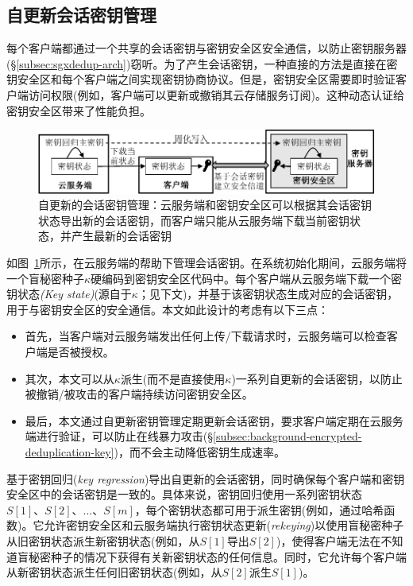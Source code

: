 \subsection{自更新会话密钥管理}
\label{subsec:sgxdedup-key-management}

每个客户端都通过一个共享的会话密钥与密钥安全区安全通信，以防止密钥服务器 (\S\ref{subsec:sgxdedup-arch})窃听。为了产生会话密钥，一种直接的方法是直接在密钥安全区和每个客户端之间实现密钥协商协议。但是，密钥安全区需要即时验证客户端访问权限(例如，客户端可以更新或撤销其云存储服务订阅)。这种动态认证给密钥安全区带来了性能负担。

\begin{figure}[!htb]
  \centering
  \includegraphics[width=\textwidth]{pic/sgxdedup/keyRegression.pdf}
  \caption{自更新的会话密钥管理：云服务端和密钥安全区可以根据其会话密钥状态导出新的会话密钥，而客户端只能从云服务端下载当前密钥状态，并产生最新的会话密钥}
  \label{fig:sgxdedup-keymanage}
\end{figure}

如图~\ref{fig:sgxdedup-keymanage}所示，\sysnameS 在云服务端的帮助下管理会话密钥。在系统初始化期间，云服务端将一个盲秘密种子$\kappa$硬编码到密钥安全区代码中。每个客户端从云服务端下载一个密钥状态\textit{(Key state)}(源自于$\kappa$；见下文)，并基于该密钥状态生成对应的会话密钥，用于与密钥安全区的安全通信。本文如此设计的考虑有以下三点：
\begin{itemize}[leftmargin=0em]
  \item 首先，当客户端对云服务端发出任何上传/下载请求时，云服务端可以检查客户端是否被授权。
  \item 其次，本文可以从$\kappa$派生(而不是直接使用$\kappa$)一系列自更新的会话密钥，以防止被撤销/被攻击的客户端持续访问密钥安全区。
  \item 最后，本文通过自更新密钥管理定期更新会话密钥，要求客户端定期在云服务端进行验证，可以防止在线暴力攻击(\S\ref{subsec:background-encrypted-deduplication-key})，而不会主动降低密钥生成速率。
\end{itemize}

\sysnameS 基于密钥回归(\textit{key regression})导出自更新的会话密钥，同时确保每个客户端和密钥安全区中的会话密钥是一致的。具体来说，密钥回归使用一系列密钥状态$S[1]、S[2]、\ldots、S[m]$，每个密钥状态都可用于派生密钥(例如，通过哈希函数)。它允许密钥安全区和云服务端执行密钥状态更新(\textit{rekeying})以使用盲秘密种子从旧密钥状态派生新密钥状态(例如，从$S[1]$导出$S[2]$)，使得客户端无法在不知道盲秘密种子的情况下获得有关新密钥状态的任何信息。同时，它允许每个客户端从新密钥状态派生任何旧密钥状态(例如，从$S[2]$派生$S[1]$)。

